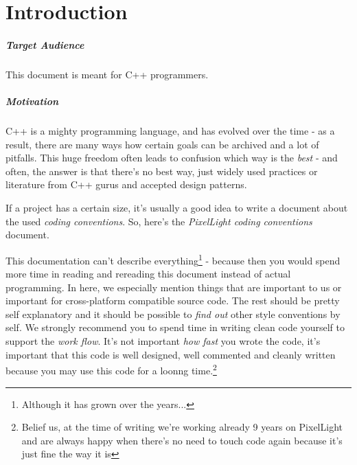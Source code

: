 \chapter{Introduction}


\paragraph{Target Audience}
This document is meant for C++ programmers.


\paragraph{Motivation}
C++ is a mighty programming language, and has evolved over the time - as a result, there are many ways how certain goals can be archived and a lot of pitfalls. This huge freedom often leads to confusion which way is the \emph{best} - and often, the answer is that there's no best way, just widely used practices or literature from C++ gurus and accepted design patterns.

If a project has a certain size, it's usually a good idea to write a document about the used \emph{coding conventions}. So, here's the \emph{PixelLight coding conventions} document.

This documentation can't describe everything\footnote{Although it has grown over the years...} - because then you would spend more time in reading and rereading this document instead of actual programming. In here, we especially mention things that are important to us or important for cross-platform compatible source code. The rest should be pretty self explanatory and it should be possible to \emph{find out} other style conventions by self. We strongly recommend you to spend time in writing clean code yourself to support the \emph{work flow}. It's not important \emph{how fast} you wrote the code, it's important that this code is well designed, well commented and cleanly written because you may use this code for a loonng time.\footnote{Belief us, at the time of writing we're working already 9 years on PixelLight and are always happy when there's no need to touch code again because it's just fine the way it is}

